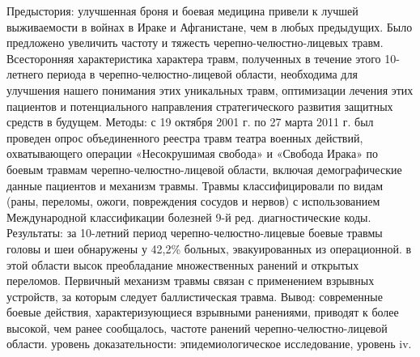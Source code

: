 Предыстория: улучшенная броня и боевая медицина привели к лучшей выживаемости в
войнах в Ираке и Афганистане, чем в любых предыдущих. Было предложено увеличить
частоту и тяжесть черепно-челюстно-лицевых травм. Всесторонняя характеристика
характера травм, полученных в течение этого 10-летнего периода в
черепно-челюстно-лицевой области, необходима для улучшения нашего понимания этих
уникальных травм, оптимизации лечения этих пациентов и потенциального
направления стратегического развития защитных средств в будущем. Методы: с 19
октября 2001 г. по 27 марта 2011 г. был проведен опрос объединенного реестра
травм театра военных действий, охватывающего операции «Несокрушимая свобода» и
«Свобода Ирака» по боевым травмам черепно-челюстно-лицевой области, включая
демографические данные пациентов и механизм травмы. Травмы классифицировали по
видам (раны, переломы, ожоги, повреждения сосудов и нервов) с использованием
Международной классификации болезней 9-й ред. диагностические коды. Результаты:
за 10-летний период черепно-челюстно-лицевые боевые травмы головы и шеи
обнаружены у 42,2\% больных, эвакуированных из операционной. в этой области высок
преобладание множественных ранений и открытых переломов. Первичный механизм
травмы связан с применением взрывных устройств, за которым следует
баллистическая травма. Вывод: современные боевые действия, характеризующиеся
взрывными ранениями, приводят к более высокой, чем ранее сообщалось, частоте
ранений черепно-челюстно-лицевой области. уровень доказательности:
эпидемиологическое исследование, уровень iv.\cite{23192069}

